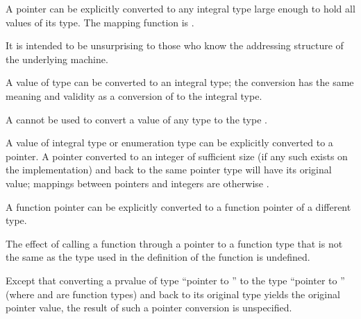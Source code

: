 \pnum
{}%
%
A pointer can be explicitly converted to any integral type large enough
to hold all values of its type.
%
The mapping function is .
\begin{note}
It is intended to be unsurprising to those who know the addressing
structure of the underlying machine.
\end{note}
A value of type  can be converted to an integral
type; the conversion has the same meaning and validity as a conversion of
 to the integral type.
\begin{note}
A 
cannot be used to convert a value of any type to the type
.
\end{note}

\pnum
{}%
%
A value of integral type or enumeration type can be explicitly converted
to a pointer. A pointer converted to an integer of sufficient size (if
any such exists on the implementation) and back to the same pointer type
will have its original value;
%
mappings between pointers and integers are otherwise
.

\pnum
{}%
%
%
A function pointer can be explicitly converted
to a function pointer of a different type.
%
\begin{note}
The effect of calling a function through a pointer to a function
type that is not the same as the type used in the
definition of the function is undefined.
\end{note}
Except that converting
a prvalue of type ``pointer to '' to the type ``pointer to
'' (where  and  are function types) and
back to its original type yields the original pointer value, the result
of such a pointer conversion is unspecified.

